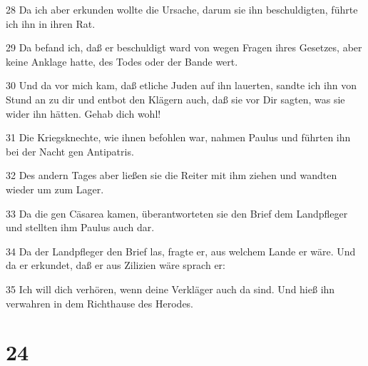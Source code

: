 \par 28 Da ich aber erkunden wollte die Ursache, darum sie ihn beschuldigten, führte ich ihn in ihren Rat.
\par 29 Da befand ich, daß er beschuldigt ward von wegen Fragen ihres Gesetzes, aber keine Anklage hatte, des Todes oder der Bande wert.
\par 30 Und da vor mich kam, daß etliche Juden auf ihn lauerten, sandte ich ihn von Stund an zu dir und entbot den Klägern auch, daß sie vor Dir sagten, was sie wider ihn hätten. Gehab dich wohl!
\par 31 Die Kriegsknechte, wie ihnen befohlen war, nahmen Paulus und führten ihn bei der Nacht gen Antipatris.
\par 32 Des andern Tages aber ließen sie die Reiter mit ihm ziehen und wandten wieder um zum Lager.
\par 33 Da die gen Cäsarea kamen, überantworteten sie den Brief dem Landpfleger und stellten ihm Paulus auch dar.
\par 34 Da der Landpfleger den Brief las, fragte er, aus welchem Lande er wäre. Und da er erkundet, daß er aus Zilizien wäre sprach er:
\par 35 Ich will dich verhören, wenn deine Verkläger auch da sind. Und hieß ihn verwahren in dem Richthause des Herodes.

\chapter{24}

